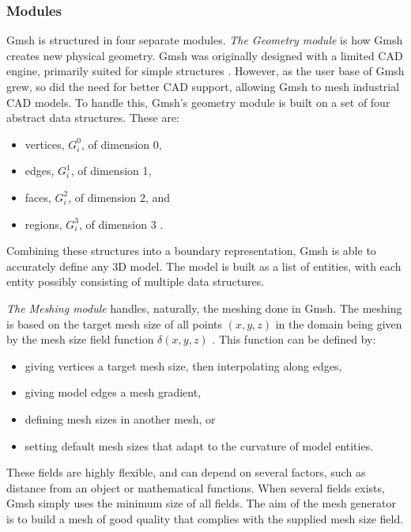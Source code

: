 \subsubsection{Modules}
Gmsh is structured in four separate modules. \emph{The Geometry module} is how Gmsh creates new physical geometry. Gmsh was originally designed with a limited CAD engine, primarily suited for simple structures \cite{Gmsh_article}. However, as the user base of Gmsh grew, so did the need for better CAD support, allowing Gmsh to mesh industrial CAD models. To handle this, Gmsh's geometry module is built on a set of four abstract data structures. These are:
\begin{itemize}
    \item vertices, $G_i^0$, of dimension 0,
    \item edges, $G_i^1$, of dimension 1,
    \item faces, $G_i^2$, of dimension 2, and
    \item regions, $G_i^3$, of dimension 3 \cite{Gmsh_article}.
\end{itemize}
Combining these structures into a boundary representation, Gmsh is able to accurately define any 3D model. The model is built as a list of entities, with each entity possibly consisting of multiple data structures.

\emph{The Meshing module} handles, naturally, the meshing done in Gmsh. The meshing is based on the target mesh size of all points $(x, y, z)$ in the domain being given by the mesh size field function $\delta(x, y, z)$ \cite{Gmsh_article}. This function can be defined by:
\begin{itemize}
    \item giving vertices a target mesh size, then interpolating along edges,
    \item giving model edges a mesh gradient,
    \item defining mesh sizes in another mesh, or
    \item setting default mesh sizes that adapt to the curvature of model entities.
\end{itemize}
These fields are highly flexible, and can depend on several factors, such as distance from an object or mathematical functions. When several fields exists, Gmsh simply uses the minimum size of all fields. The aim of the mesh generator is to build a mesh of good quality that complies with the supplied mesh size field.

